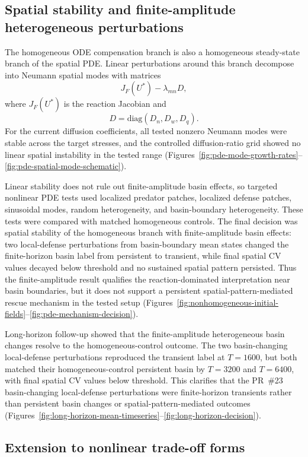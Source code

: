 \documentclass[11pt]{article}
\begin{document}
\subsection{Spatial stability and finite-amplitude heterogeneous perturbations}

The homogeneous ODE compensation branch is also a homogeneous steady-state branch of the spatial PDE. Linear perturbations around this branch decompose into Neumann spatial modes with matrices
\[
J_F(U^*)-\lambda_{mn}D,
\]
where \(J_F(U^*)\) is the reaction Jacobian and
\[
D=\mathrm{diag}(D_n,D_w,D_q).
\]
For the current diffusion coefficients, all tested nonzero Neumann modes were stable across the target stresses, and the controlled diffusion-ratio grid showed no linear spatial instability in the tested range (Figures~\ref{fig:pde-mode-growth-rates}--\ref{fig:pde-spatial-mode-schematic}).

Linear stability does not rule out finite-amplitude basin effects, so targeted nonlinear PDE tests used localized predator patches, localized defense patches, sinusoidal modes, random heterogeneity, and basin-boundary heterogeneity. These tests were compared with matched homogeneous controls. The final decision was spatial stability of the homogeneous branch with finite-amplitude basin effects: two local-defense perturbations from basin-boundary mean states changed the finite-horizon basin label from persistent to transient, while final spatial CV values decayed below threshold and no sustained spatial pattern persisted. Thus the finite-amplitude result qualifies the reaction-dominated interpretation near basin boundaries, but it does not support a persistent spatial-pattern-mediated rescue mechanism in the tested setup (Figures~\ref{fig:nonhomogeneous-initial-fields}--\ref{fig:pde-mechanism-decision}).

Long-horizon follow-up showed that the finite-amplitude heterogeneous basin changes resolve to the homogeneous-control outcome. The two basin-changing local-defense perturbations reproduced the transient label at \(T=1600\), but both matched their homogeneous-control persistent basin by \(T=3200\) and \(T=6400\), with final spatial CV values below threshold. This clarifies that the PR~\#23 basin-changing local-defense perturbations were finite-horizon transients rather than persistent basin changes or spatial-pattern-mediated outcomes (Figures~\ref{fig:long-horizon-mean-timeseries}--\ref{fig:long-horizon-decision}).

\subsection{Extension to nonlinear trade-off forms}
\end{document}
